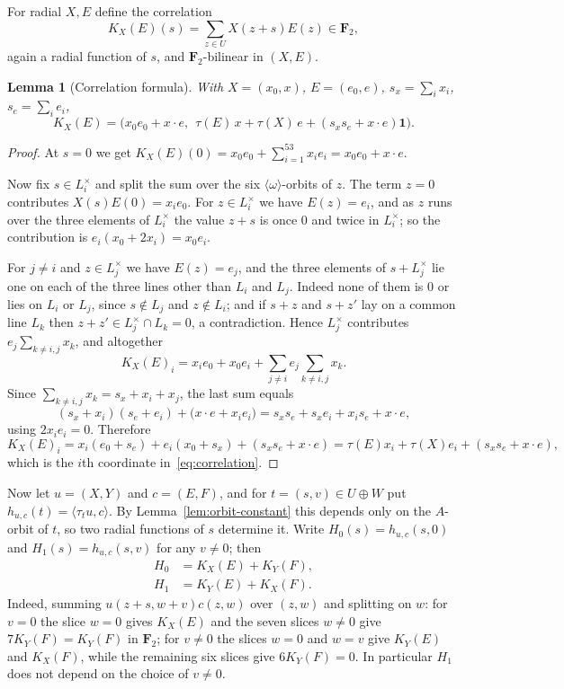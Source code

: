 \documentclass[11pt,a4paper,reqno]{amsart}
\newtheorem{lemma}[theorem]{Lemma}
\theoremstyle{definition}
\theoremstyle{remark}
\newcommand{\F}{\mathbf F}
\newcommand{\one}{\mathbf 1}
\begin{document}
For radial $X,E$ define the correlation
\[
 K_X(E)(s)=\sum_{z\in U}X(z+s)E(z)\in\F_2 ,
\]
again a radial function of $s$, and $\F_2$-bilinear in $(X,E)$.

\begin{lemma}[Correlation formula]\label{lem:correlation}
With $X=(x_0,x)$, $E=(e_0,e)$, $s_x=\sum_ix_i$, $s_e=\sum_ie_i$,
\begin{equation}\label{eq:correlation}
 K_X(E)=
 \bigl(
 x_0e_0+x\cdot e,\ \
 \tau(E)\,x+\tau(X)\,e+(s_xs_e+x\cdot e)\one
 \bigr).
\end{equation}
\end{lemma}

\begin{proof}
At $s=0$ we get
$K_X(E)(0)=x_0e_0+\sum_{i=1}^53x_ie_i=x_0e_0+x\cdot e$.

Now fix $s\in L_i^\times$ and split the sum over the six
$\langle\omega\rangle$-orbits of $z$.  The term $z=0$ contributes
$X(s)E(0)=x_ie_0$.  For $z\in L_i^\times$ we have $E(z)=e_i$, and as
$z$ runs over the three elements of $L_i^\times$ the value $z+s$ is
once $0$ and twice in $L_i^\times$; so the contribution is
$e_i(x_0+2x_i)=x_0e_i$.

For $j\neq i$ and $z\in L_j^\times$ we have $E(z)=e_j$, and the three
elements of $s+L_j^\times$ lie one on each of the three lines other
than $L_i$ and $L_j$.  Indeed none of them is $0$ or lies on $L_i$ or
$L_j$, since $s\notin L_j$ and $z\notin L_i$; and if $s+z$ and $s+z'$
lay on a common line $L_k$ then $z+z'\in L_j^\times\cap L_k=0$, a
contradiction.  Hence $L_j^\times$ contributes
$e_j\sum_{k\neq i,j}x_k$, and altogether
\[
 K_X(E)_i=x_ie_0+x_0e_i+\sum_{j\neq i}e_j\sum_{k\neq i,j}x_k .
\]
Since $\sum_{k\neq i,j}x_k=s_x+x_i+x_j$, the last sum equals
\[
 (s_x+x_i)(s_e+e_i)+\bigl(x\cdot e+x_ie_i\bigr)
 =s_xs_e+s_xe_i+x_is_e+x\cdot e ,
\]
using $2x_ie_i=0$.  Therefore
\[
 K_X(E)_i=x_i(e_0+s_e)+e_i(x_0+s_x)+(s_xs_e+x\cdot e)
 =\tau(E)x_i+\tau(X)e_i+(s_xs_e+x\cdot e),
\]
which is the $i$th coordinate in~\eqref{eq:correlation}.
\end{proof}

Now let $u=(X,Y)$ and $c=(E,F)$, and for $t=(s,v)\in U\oplus W$ put
$h_{u,c}(t)=\langle\tau_tu,c\rangle$.  By
Lemma~\ref{lem:orbit-constant} this depends only on the $A$-orbit of
$t$, so two radial functions of $s$ determine it.  Write
$H_0(s)=h_{u,c}(s,0)$ and $H_1(s)=h_{u,c}(s,v)$ for any $v\neq0$; then
\begin{align}
 H_0&=K_X(E)+K_Y(F),\label{eq:H0}\\
 H_1&=K_Y(E)+K_X(F).\label{eq:H1}
\end{align}
Indeed, summing $u(z+s,w+v)c(z,w)$ over $(z,w)$ and splitting on $w$:
for $v=0$ the slice $w=0$ gives $K_X(E)$ and the seven slices $w\neq0$
give $7K_Y(F)=K_Y(F)$ in $\F_2$; for $v\neq0$ the slices $w=0$ and
$w=v$ give $K_Y(E)$ and $K_X(F)$, while the remaining six slices give
$6K_Y(F)=0$.  In particular $H_1$ does not depend on the choice of
$v\neq0$.
\end{document}
